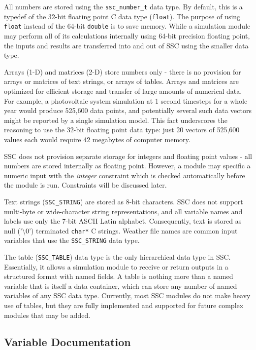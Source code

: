 \documentclass{article}
\begin{document}
All numbers are stored using the \texttt{ssc\_number\_t} data type.  By default, this is a typedef of the 32-bit floating point C data type (\texttt{float}).  The purpose of using \texttt{float} instead of the 64-bit \texttt{double} is to save memory.  While a simulation module may perform all of its calculations internally using 64-bit precision floating point, the inputs and results are transferred into and out of SSC using the smaller data type.

Arrays (1-D) and matrices (2-D) store numbers only - there is no provision for arrays or matrices of text strings, or arrays of tables.  Arrays and matrices are optimized for efficient storage and transfer of large amounts of numerical data.  For example, a photovoltaic system simulation at 1 second timesteps for a whole year would produce 525,600 data points, and potentially several such data vectors might be reported by a single simulation model.  This fact underscores the reasoning to use the 32-bit floating point data type: just 20 vectors of 525,600 values each would require 42 megabytes of computer memory.

SSC does not provision separate storage for integers and floating point values - all numbers are stored internally as floating point.  However, a module may specific a numeric input with the \emph{integer} constraint which is checked automatically before the module is run.  Constraints will be discussed later.

Text strings (\texttt{SSC\_STRING})  are stored as 8-bit characters.  SSC does not support multi-byte or wide-character string representations, and all variable names and labels use only the 7-bit ASCII Latin alphabet.  Consequently, text is stored as null ('\textbackslash 0') terminated \texttt{char*} C strings.  Weather file names are common input variables that use the \texttt{SSC\_STRING} data type.

The table (\texttt{SSC\_TABLE}) data type is the only hierarchical data type in SSC.  Essentially, it allows a simulation module to receive or return outputs in a structured format with named fields.  A table is nothing more than a named variable that is itself a data container, which can store any number of named variables of any SSC data type.  Currently, most SSC modules do not make heavy use of tables, but they are fully implemented and supported for future complex modules that may be added.

\subsection{Variable Documentation}
\label{sec_variable_docs}
\end{document}
